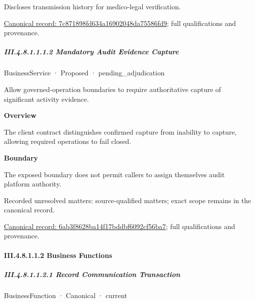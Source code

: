 Discloses transmission history for medico-legal verification.


{\footnotesize \href{../../../../continuum/business/business-service/7c871898fd634a16902048da75586fd9.md}{Canonical record: 7c871898fd634a16902048da75586fd9}; full qualifications and provenance.}\par
\subparagraph*{III.4.8.1.1.1.2 Mandatory Audit Evidence Capture}
\label{navigation:III.4.8.1.1.1.2}

\label{element:6ab3f8628ba14f17bddbf6092cf56ba7}
{\small BusinessService · Proposed · pending\_adjudication}\par

Allow governed-operation boundaries to require authoritative capture of significant activity evidence.



\textbf{Overview}



The client contract distinguishes confirmed capture from inability to capture, allowing required operations to fail closed.



\textbf{Boundary}



The exposed boundary does not permit callers to assign themselves audit platform authority.


{\small Recorded unresolved matters: source-qualified matters; exact scope remains in the canonical record.}\par
{\footnotesize \href{../../../../continuum/business/business-service/6ab3f8628ba14f17bddbf6092cf56ba7.md}{Canonical record: 6ab3f8628ba14f17bddbf6092cf56ba7}; full qualifications and provenance.}\par
\paragraph*{III.4.8.1.1.2 Business Functions}
\label{navigation:III.4.8.1.1.2}

\subparagraph*{III.4.8.1.1.2.1 Record Communication Transaction}
\label{navigation:III.4.8.1.1.2.1}

\label{element:d64ced698052400fa7892e4d768b3f8f}
{\small BusinessFunction · Canonical · current}\par

